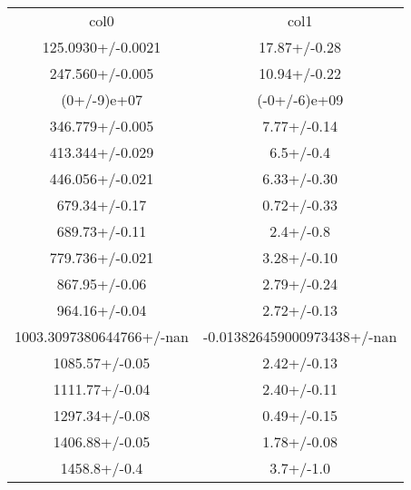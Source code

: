 \begin{table}
\begin{tabular}{cc}
col0 & col1 \\
125.0930+/-0.0021 & 17.87+/-0.28 \\
247.560+/-0.005 & 10.94+/-0.22 \\
(0+/-9)e+07 & (-0+/-6)e+09 \\
346.779+/-0.005 & 7.77+/-0.14 \\
413.344+/-0.029 & 6.5+/-0.4 \\
446.056+/-0.021 & 6.33+/-0.30 \\
679.34+/-0.17 & 0.72+/-0.33 \\
689.73+/-0.11 & 2.4+/-0.8 \\
779.736+/-0.021 & 3.28+/-0.10 \\
867.95+/-0.06 & 2.79+/-0.24 \\
964.16+/-0.04 & 2.72+/-0.13 \\
1003.3097380644766+/-nan & -0.013826459000973438+/-nan \\
1085.57+/-0.05 & 2.42+/-0.13 \\
1111.77+/-0.04 & 2.40+/-0.11 \\
1297.34+/-0.08 & 0.49+/-0.15 \\
1406.88+/-0.05 & 1.78+/-0.08 \\
1458.8+/-0.4 & 3.7+/-1.0 \\
\end{tabular}
\end{table}
